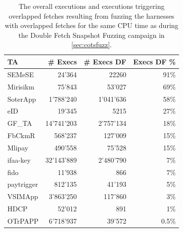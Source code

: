 \documentclass[letterpaper,twocolumn,10pt]{article}
\newcommand{\stagetwo}{Double Fetch Snapshot Fuzzing\xspace}
\newcommand{\eighteigthce}{Mlipay\xspace}
\newcommand{\aseventhreefour}{GF\_TA\xspace}
\newcommand{\sixfivefivea}{OTrPAPP\xspace}
\newcommand{\eightaaa}{Mirisikm\xspace}
\newcommand{\zeroeightzeroone}{ifaa-key\xspace}
\newcommand{\onefourbzero}{fido\xspace}
\newcommand{\dfonee}{paytrigger\xspace}
\newcommand{\fivethreefourfive}{SEMeSE\xspace}
\newcommand{\anineeightfive}{eID\xspace}
\newcommand{\foureightfourfour}{HDCP\xspace}
\newcommand{\foursixsixtwo}{FbCkmR\xspace}
\newcommand{\threesevensevene}{SoterApp\xspace}
\newcommand{\threedzeroeight}{VSIMApp\xspace}
\newcommand{\numexecseighteightce}{490'558\xspace}
\newcommand{\numexecsdfeighteightce}{75'528\xspace}
\newcommand{\numexecsdfperceighteightce}{15\%\xspace}
\newcommand{\numexecsaseventhreefour}{14'741'203\xspace}
\newcommand{\numexecsdfaseventhreefour}{2'757'134\xspace}
\newcommand{\numexecsdfpercaseventhreefour}{18\%\xspace}
\newcommand{\numexecssixfivefivea}{6'718'937\xspace}
\newcommand{\numexecsdfsixfivefivea}{39'572\xspace}
\newcommand{\numexecsdfpercsixfivefivea}{0.5\%\xspace}
\newcommand{\numexecseightaaa}{75'843\xspace}
\newcommand{\numexecsdfeightaaa}{53'027\xspace}
\newcommand{\numexecsdfperceightaaa}{69\%\xspace}
\newcommand{\numexecszeroeightzeroone}{32'143'889\xspace}
\newcommand{\numexecsdfzeroeightzeroone}{2'480'790\xspace}
\newcommand{\numexecsdfperczeroeightzeroone}{7\%\xspace}
\newcommand{\numexecsonefourbzero}{11'938\xspace}
\newcommand{\numexecsdfonefourbzero}{866\xspace}
\newcommand{\numexecsdfperconefourbzero}{7\%\xspace}
\newcommand{\numexecsdfonee}{812'135\xspace}
\newcommand{\numexecsdfdfonee}{41'193\xspace}
\newcommand{\numexecsdfpercdfonee}{5\%\xspace}
\newcommand{\numexecsfivethreefourfive}{24'364\xspace}
\newcommand{\numexecsdffivethreefourfive}{22260\xspace}
\newcommand{\numexecsdfpercfivethreefourfive}{91\%\xspace}
\newcommand{\numexecsanineeightfive}{19'345\xspace}
\newcommand{\numexecsdfanineeightfive}{5215\xspace}
\newcommand{\numexecsdfpercanineeightfive}{27\%\xspace}
\newcommand{\numexecsfoureightfourfour}{52'012\xspace}
\newcommand{\numexecsdffoureightfourfour}{891\xspace}
\newcommand{\numexecsdfpercfoureightfourfour}{1\%\xspace}
\newcommand{\numexecsthreedzeroeight}{3'863'250\xspace}
\newcommand{\numexecsdfthreedzeroeight}{117'860\xspace}
\newcommand{\numexecsdfpercthreedzeroeight}{3\%\xspace}
\newcommand{\numexecsfoursixsixtwo}{568'237\xspace}
\newcommand{\numexecsdffoursixsixtwo}{127'009\xspace}
\newcommand{\numexecsdfpercfoursixsixtwo}{15\%\xspace}
\newcommand{\numexecsthreesevensevene}{1'788'240\xspace}
\newcommand{\numexecsdfthreesevensevene}{1'041'636\xspace}
\newcommand{\numexecsdfpercthreesevensevene}{58\%\xspace}
\begin{document}
\begin{table}[t]
    \footnotesize
    \centering
    \begin{tabular}{lrrr}
        \toprule
        TA&
        \# Execs &
        \# Execs DF &
        Execs DF \%\\
        \toprule
        \fivethreefourfive & \numexecsfivethreefourfive &\numexecsdffivethreefourfive  & \numexecsdfpercfivethreefourfive\\
        \eightaaa & \numexecseightaaa &\numexecsdfeightaaa  & \numexecsdfperceightaaa\\
        \threesevensevene & \numexecsthreesevensevene &\numexecsdfthreesevensevene  &\numexecsdfpercthreesevensevene\\
        \anineeightfive & \numexecsanineeightfive &\numexecsdfanineeightfive  &\numexecsdfpercanineeightfive\\
        \aseventhreefour & \numexecsaseventhreefour &\numexecsdfaseventhreefour  &\numexecsdfpercaseventhreefour\\
        \foursixsixtwo & \numexecsfoursixsixtwo &\numexecsdffoursixsixtwo  &\numexecsdfpercfoursixsixtwo\\
        \eighteigthce & \numexecseighteightce  & \numexecsdfeighteightce &\numexecsdfperceighteightce\\
        \zeroeightzeroone & \numexecszeroeightzeroone &\numexecsdfzeroeightzeroone  &\numexecsdfperczeroeightzeroone\\
        \onefourbzero & \numexecsonefourbzero &\numexecsdfonefourbzero  &\numexecsdfperconefourbzero\\
        \dfonee & \numexecsdfonee &\numexecsdfdfonee  &\numexecsdfpercdfonee\\
        \threedzeroeight & \numexecsthreedzeroeight  & \numexecsdfthreedzeroeight &\numexecsdfpercthreedzeroeight\\
        \foureightfourfour & \numexecsfoureightfourfour &\numexecsdffoureightfourfour  &\numexecsdfpercfoureightfourfour\\
        \sixfivefivea & \numexecssixfivefivea &\numexecsdfsixfivefivea  &\numexecsdfpercsixfivefivea\\
        
        \bottomrule
    \end{tabular}
    \caption{
        The overall executions and executions triggering overlapped fetches resulting from fuzzing the harnesses with overlapped 
        fetches for the same CPU time as during the \stagetwo campaign in \autoref{sec:cotsfuzz}. 
    }
    \label{tab:reshape}
\end{table}
\end{document}
